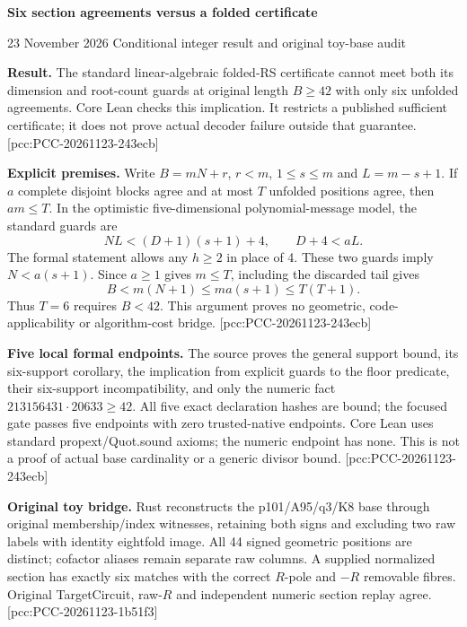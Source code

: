 \documentclass[10pt]{article}
\begin{document}
{\Large\bfseries\color{ink} Six section agreements versus a folded certificate}\par
{\small 23 November 2026 \quad Conditional integer result and original toy-base audit}

\textbf{Result.} The standard linear-algebraic folded-RS certificate cannot
meet both its dimension and root-count guards at original length $B\ge42$
with only six unfolded agreements. Core Lean checks this implication.
It restricts a published sufficient certificate; it does not prove actual
decoder failure outside that guarantee. [pcc:PCC-20261123-243ecb]

\textbf{Explicit premises.} Write $B=mN+r$, $r<m$, $1\le s\le m$ and
$L=m-s+1$. If $a$ complete disjoint blocks agree and at most $T$ unfolded
positions agree, then $am\le T$. In the optimistic five-dimensional
polynomial-message model, the standard guards are
\[
 NL<(D+1)(s+1)+4,\qquad D+4<aL .
\]
The formal statement allows any $h\ge2$ in place of 4. These two guards imply
$N<a(s+1)$. Since $a\ge1$ gives $m\le T$, including the discarded tail gives
\[
 B<m(N+1)\le ma(s+1)\le T(T+1).
\]
Thus $T=6$ requires $B<42$. This argument proves no geometric, code-applicability
or algorithm-cost bridge. [pcc:PCC-20261123-243ecb]

\textbf{Five local formal endpoints.} The source proves the general support
bound, its six-support corollary, the implication from explicit guards to the
floor predicate, their six-support incompatibility, and only the numeric fact
$213156431\cdot20633\ge42$. All five exact declaration hashes are bound;
the focused gate passes five endpoints with zero trusted-native endpoints.
Core Lean uses standard propext/Quot.sound axioms; the numeric endpoint has
none. This is not a proof of actual base cardinality or a generic divisor
bound. [pcc:PCC-20261123-243ecb]

\textbf{Original toy bridge.} Rust reconstructs the p101/A95/q3/K8 base
through original membership/index witnesses, retaining both signs and
excluding two raw labels with identity eightfold image. All 44 signed geometric
positions are distinct; cofactor aliases remain separate raw columns. A
supplied normalized section has exactly six matches with the correct $R$-pole
and $-R$ removable fibres. Original TargetCircuit, raw-$R$ and independent
numeric section replay agree. [pcc:PCC-20261123-1b51f3]
\end{document}
